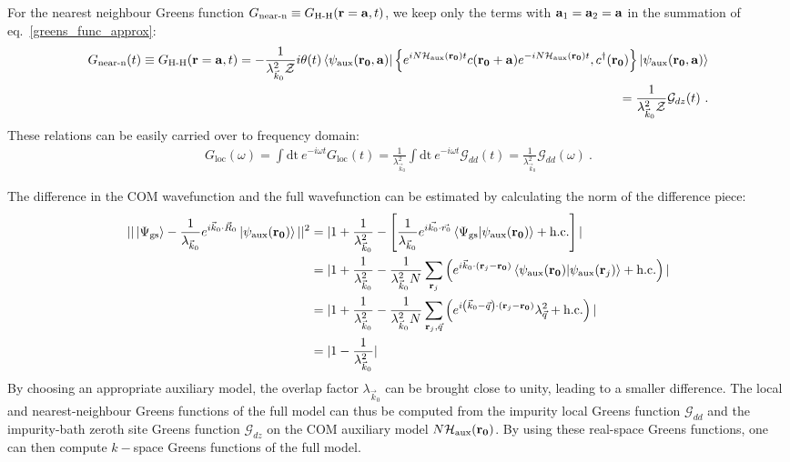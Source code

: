 \documentclass[reprint,hidelinks]{revtex4-2}
\begin{document}
For the nearest neighbour Greens function \(G_\text{near-n} \equiv G_\text{H-H}({\bf r}={\bf a}, t)\), we keep only the terms with \({\bf a}_1 = {\bf a}_2 = {\bf a}\) in the summation of eq.~\ref{greens_func_approx}:
\begin{equation}\begin{aligned}
	\label{greens_func_relation_near}
	G_\text{near-n}(t) \equiv G_\text{H-H}({\bf r}={\bf a}, t) = -\frac{1}{\lambda_{\vec k_0}^2 \mathcal{Z}}i\theta(t) \braket{\psi_\text{aux}({\bf r_0}, {\bf a}) | \left\{ e^{i N \mathcal{H}_\text{aux}({\bf r_0}) t}c({\bf r_0} + {\bf a})e^{-i N \mathcal{H}_\text{aux}({\bf r_0}) t}, c^\dagger({\bf r_0}) \right\} | \psi_\text{aux}({\bf r_0}, {\bf a})} \\
	= \frac{1}{\lambda_{\vec k_0}^2 \mathcal{Z}} \mathcal{G}_{dz}(t)~.
\end{aligned}\end{equation}
These relations can be easily carried over to frequency domain: 
\begin{equation}\begin{aligned}
	G_\text{loc}(\omega) = \int \mathrm{dt}~e^{-i\omega t} G_\text{loc}(t) = \frac{1}{\lambda_{\vec k_0}^2}\int \mathrm{dt}~e^{-i\omega t} \mathcal{G}_{dd}(t) = \frac{1}{\lambda_{\vec k_0}^2} \mathcal{G}_{dd}(\omega)~.
\end{aligned}\end{equation}

The difference in the COM wavefunction and the full wavefunction can be estimated by calculating the norm of the difference piece:
\begin{equation}\begin{aligned}
	||\ket{\Psi_\text{gs}} - \frac{1}{\lambda_{\vec k_0}} e^{i\vec{k}_0\cdot\vec{R}_0} \ket{\psi_\text{aux}({\bf r_0})}||^2 &= |1 + \frac{1}{\lambda_{\vec k_0}^2} - \left[\frac{1}{\lambda_{\vec k_0}}e^{i \vec{k_0}\cdot\vec{r_0}}\braket{\Psi_\text{gs} | \psi_\text{aux}({\bf r_0})} + \text{h.c.}\right]| \\
	&=|1 + \frac{1}{\lambda_{\vec k_0}^2} - \frac{1}{\lambda_{\vec k_0}^2 N}\sum_{{\bf r}_j} \left(e^{i \vec k_0 \cdot \left( {\bf r}_j - {\bf r_0} \right)}  \braket{\psi_\text{aux}({\bf r_0}) | \psi_\text{aux}({\bf r}_j) } + \text{h.c.}\right)|\\
	&=|1 + \frac{1}{\lambda_{\vec k_0}^2} - \frac{1}{\lambda_{\vec k_0}^2 N}\sum_{{\bf r}_j,\vec q} \left(e^{i \left(\vec k_0 - \vec q\right)\cdot \left( {\bf r}_j - {\bf r_0} \right)}\lambda_{\vec q}^2 + \text{h.c.}\right)|\\
	&= |1 - \frac{1}{\lambda_{\vec k_0}^2}|
\end{aligned}\end{equation}
By choosing an appropriate auxiliary model, the overlap factor \(\lambda_{\vec k_0}\) can be brought close to unity, leading to a smaller difference. The local and nearest-neighbour Greens functions of the full model can thus be computed from the impurity local Greens function \(\mathcal{G}_{dd}\) and the impurity-bath zeroth site Greens function \(\mathcal{G}_{dz}\) on the COM auxiliary model \(N \mathcal{H}_\text{aux}({\bf r_0})\). By using these real-space Greens functions, one can then compute \(k-\)space Greens functions of the full model. 
\end{document}

